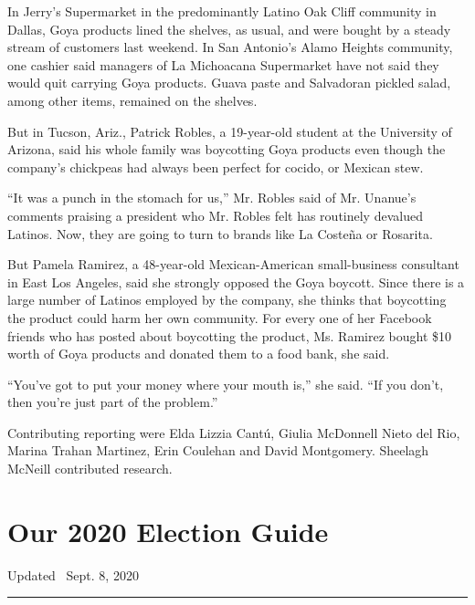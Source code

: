 In Jerry's Supermarket in the predominantly Latino Oak Cliff community
in Dallas, Goya products lined the shelves, as usual, and were bought by
a steady stream of customers last weekend. In San Antonio's Alamo
Heights community, one cashier said managers of La Michoacana
Supermarket have not said they would quit carrying Goya products. Guava
paste and Salvadoran pickled salad, among other items, remained on the
shelves.

But in Tucson, Ariz., Patrick Robles, a 19-year-old student at the
University of Arizona, said his whole family was boycotting Goya
products even though the company's chickpeas had always been perfect for
cocido, or Mexican stew.

``It was a punch in the stomach for us,'' Mr. Robles said of Mr.
Unanue's comments praising a president who Mr. Robles felt has routinely
devalued Latinos. Now, they are going to turn to brands like La Costeña
or Rosarita.

But Pamela Ramirez, a 48-year-old Mexican-American small-business
consultant in East Los Angeles, said she strongly opposed the Goya
boycott. Since there is a large number of Latinos employed by the
company, she thinks that boycotting the product could harm her own
community. For every one of her Facebook friends who has posted about
boycotting the product, Ms. Ramirez bought \$10 worth of Goya products
and donated them to a food bank, she said.

``You've got to put your money where your mouth is,'' she said. ``If you
don't, then you're just part of the problem.''

Contributing reporting were Elda Lizzia Cantú, Giulia McDonnell Nieto
del Rio, Marina Trahan Martinez, Erin Coulehan and David Montgomery.
Sheelagh McNeill contributed research.

\hypertarget{our-2020-election-guide}{%
\section{Our 2020 Election Guide}\label{our-2020-election-guide}}

Updated ~Sept. 8, 2020

\begin{center}\rule{0.5\linewidth}{\linethickness}\end{center}

